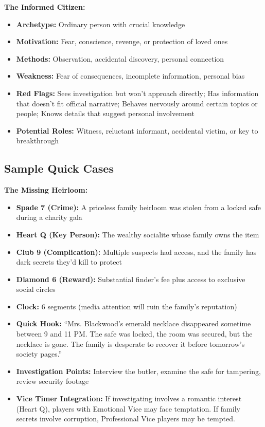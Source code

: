 \documentclass[11pt]{article}
\begin{document}
\textbf{The Informed Citizen:}
\begin{itemize}
    \item \textbf{Archetype:} Ordinary person with crucial knowledge
    \item \textbf{Motivation:} Fear, conscience, revenge, or protection of loved ones
    \item \textbf{Methods:} Observation, accidental discovery, personal connection
    \item \textbf{Weakness:} Fear of consequences, incomplete information, personal bias
    \item \textbf{Red Flags:} Sees investigation but won't approach directly; Has information that doesn't fit official narrative; Behaves nervously around certain topics or people; Knows details that suggest personal involvement
    \item \textbf{Potential Roles:} Witness, reluctant informant, accidental victim, or key to breakthrough
\end{itemize}

\subsection{Sample Quick Cases}

\textbf{The Missing Heirloom:}
\begin{itemize}
    \item \textbf{Spade 7 (Crime):} A priceless family heirloom was stolen from a locked safe during a charity gala
    \item \textbf{Heart Q (Key Person):} The wealthy socialite whose family owns the item
    \item \textbf{Club 9 (Complication):} Multiple suspects had access, and the family has dark secrets they'd kill to protect
    \item \textbf{Diamond 6 (Reward):} Substantial finder's fee plus access to exclusive social circles
    \item \textbf{Clock:} 6 segments (media attention will ruin the family's reputation)
    \item \textbf{Quick Hook:} ``Mrs. Blackwood's emerald necklace disappeared sometime between 9 and 11 PM. The safe was locked, the room was secured, but the necklace is gone. The family is desperate to recover it before tomorrow's society pages.''
    \item \textbf{Investigation Points:} Interview the butler, examine the safe for tampering, review security footage
    \item \textbf{Vice Timer Integration:} If investigating involves a romantic interest (Heart Q), players with Emotional Vice may face temptation. If family secrets involve corruption, Professional Vice players may be tempted.
\end{itemize}
\end{document}
